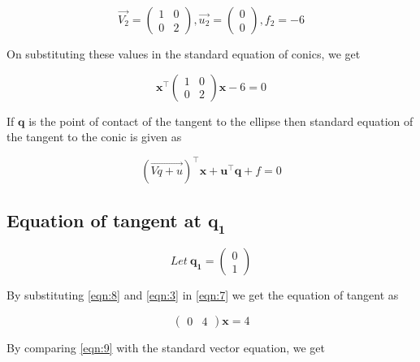 \documentclass[journal,10pt,twocolumn]{article}
\let\vec\mathbf
\newcommand{\myvec}[1]{\ensuremath{\begin{pmatrix}#1\end{pmatrix}}}
\begin{document}
    \begin{equation}
    \label{eqn:5}
        \Vec{V_2} = \myvec{1 & 0 \\ 0 & 2} , \Vec{u_2} = \myvec{0 \\ 0} , f_2 = -6
    \end{equation}
    
    \begin{flushleft}
        On substituting these values in the standard equation of conics, we get
    \end{flushleft}
    
    \begin{equation}
    \label{eqn:6}
        \vec{x^\top}\myvec{1 & 0 \\ 0 & 2}\vec{x} - 6 = 0 
    \end{equation}
    
    \begin{flushleft}
        If $\vec{q}$ is the point of contact of the tangent to the ellipse then standard equation of the tangent to the conic is given as
    \end{flushleft}
    
    \begin{equation}
    \label{eqn:7}
        (\Vec{Vq + u})^\top\vec{x} + \vec{u}^\top\vec{q} + f = 0
    \end{equation}

    \subsection{Equation of tangent at $\vec{q_1}$}
    \begin{equation}
    \label{eqn:8}
        Let \ \vec{q_1} = \myvec{0 \\ 1}
    \end{equation}
    
    \begin{flushleft}
        By substituting \eqref{eqn:8} and \eqref{eqn:3} in \eqref{eqn:7} we get the equation of tangent as
    \end{flushleft}
    
    \begin{equation}
    \label{eqn:9}
        \myvec{0 & 4}\vec{x} = 4
    \end{equation}
    
    \begin{flushleft}
        By comparing \eqref{eqn:9} with the standard vector equation, we get 
    \end{flushleft}
    
\end{document}
